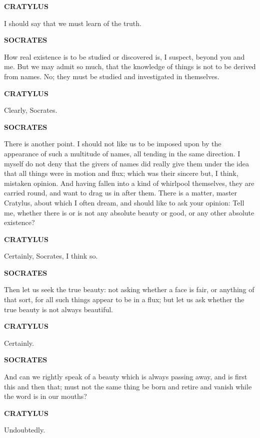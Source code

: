 \documentclass[11pt,letter]{article}
\begin{document}
\par \textbf{CRATYLUS}
\par   I should say that we must learn of the truth.

\par \textbf{SOCRATES}
\par   How real existence is to be studied or discovered is, I suspect, beyond you and me. But we may admit so much, that the knowledge of things is not to be derived from names. No; they must be studied and investigated in themselves.

\par \textbf{CRATYLUS}
\par   Clearly, Socrates.

\par \textbf{SOCRATES}
\par   There is another point. I should not like us to be imposed upon by the appearance of such a multitude of names, all tending in the same direction. I myself do not deny that the givers of names did really give them under the idea that all things were in motion and flux; which was their sincere but, I think, mistaken opinion. And having fallen into a kind of whirlpool themselves, they are carried round, and want to drag us in after them. There is a matter, master Cratylus, about which I often dream, and should like to ask your opinion:  Tell me, whether there is or is not any absolute beauty or good, or any other absolute existence?

\par \textbf{CRATYLUS}
\par   Certainly, Socrates, I think so.

\par \textbf{SOCRATES}
\par   Then let us seek the true beauty:  not asking whether a face is fair, or anything of that sort, for all such things appear to be in a flux; but let us ask whether the true beauty is not always beautiful.

\par \textbf{CRATYLUS}
\par   Certainly.

\par \textbf{SOCRATES}
\par   And can we rightly speak of a beauty which is always passing away, and is first this and then that; must not the same thing be born and retire and vanish while the word is in our mouths?

\par \textbf{CRATYLUS}
\par   Undoubtedly.
\end{document}
